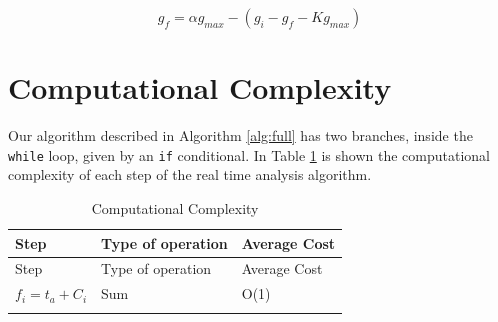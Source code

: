 \documentclass[
  12pt,
  a4paperpaper,
]{report}
\begin{document}
\begin{equation}
g_f = \alpha g_{max} - (g_i -  g_f - K g_{max} )
\label{eq:new_g_f}
\end{equation}

\hypertarget{computational-complexity}{%
\section{Computational Complexity}\label{computational-complexity}}

Our algorithm described in Algorithm \ref{alg:full} has two branches,
inside the \texttt{while} loop, given by an \texttt{if} conditional. In
Table \ref{tab:bigO} is shown the computational complexity of each step
of the real time analysis algorithm.

\begin{longtable}[]{@{}lll@{}}
\caption{Computational Complexity \label{tab:bigO}}\tabularnewline
\toprule
\begin{minipage}[b]{0.52\columnwidth}\raggedright
Step\strut
\end{minipage} & \begin{minipage}[b]{0.24\columnwidth}\raggedright
Type of operation\strut
\end{minipage} & \begin{minipage}[b]{0.15\columnwidth}\raggedright
Average Cost\strut
\end{minipage}\tabularnewline
\midrule
\endfirsthead
\toprule
\begin{minipage}[b]{0.52\columnwidth}\raggedright
Step\strut
\end{minipage} & \begin{minipage}[b]{0.24\columnwidth}\raggedright
Type of operation\strut
\end{minipage} & \begin{minipage}[b]{0.15\columnwidth}\raggedright
Average Cost\strut
\end{minipage}\tabularnewline
\midrule
\endhead
\begin{minipage}[t]{0.52\columnwidth}\raggedright
\(f_i = t_a + C_i\)\strut
\end{minipage} & \begin{minipage}[t]{0.24\columnwidth}\raggedright
Sum\strut
\end{minipage} & \begin{minipage}[t]{0.15\columnwidth}\raggedright
O(1)\strut
\end{minipage}\tabularnewline
\begin{minipage}[t]{0.52\columnwidth}\raggedright

\end{minipage}
\end{longtable}
\end{document}
